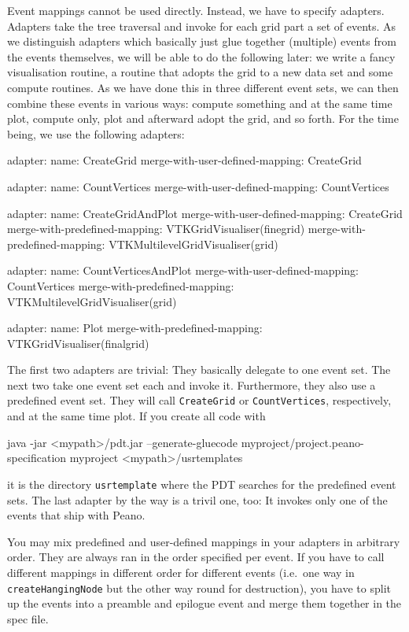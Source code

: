 \noindent
Event mappings cannot be used directly.
Instead, we have to specify adapters. 
Adapters take the tree traversal and invoke for each grid part a set of events. 
As we distinguish adapters which basically just glue together (multiple) events
from the events themselves, we will be able to do the following later:
we write a fancy visualisation routine, a routine that adopts the grid to a new
data set and some compute routines.
As we have done this in three different event sets, we can then combine these
events in various ways: compute something and at the same time plot, compute
only, plot and afterward adopt the grid, and so forth.
For the time being, we use the following adapters:

\begin{code}
adapter:
  name: CreateGrid
  merge-with-user-defined-mapping: CreateGrid

adapter:
  name: CountVertices
  merge-with-user-defined-mapping: CountVertices

adapter:
  name: CreateGridAndPlot
  merge-with-user-defined-mapping: CreateGrid
  merge-with-predefined-mapping: VTKGridVisualiser(finegrid)
  merge-with-predefined-mapping: VTKMultilevelGridVisualiser(grid)

adapter:
  name: CountVerticesAndPlot
  merge-with-user-defined-mapping: CountVertices
  merge-with-predefined-mapping: VTKMultilevelGridVisualiser(grid)

adapter:
  name: Plot
  merge-with-predefined-mapping: VTKGridVisualiser(finalgrid)
\end{code}

The first two adapters are trivial: 
They basically delegate to one event set. 
The next two take one event set each and invoke it. 
Furthermore, they also use a predefined event set. 
They will call \texttt{CreateGrid} or \texttt{CountVertices}, respectively, and
at the same time plot.
If you create all code with 

\begin{code}
java -jar <mypath>/pdt.jar --generate-gluecode
myproject/project.peano-specification myproject <mypath>/usrtemplates
\end{code}

\noindent
it is the directory \texttt{usrtemplate} where the PDT searches for the
predefined event sets.
The last adapter by the way is a trivil one, too: It invokes only one of the
events that ship with Peano.

\begin{remark}
You may mix predefined and user-defined mappings in your adapters in arbitrary
order. 
They are always ran in the order specified per event.
If you have to call different mappings in different order for different events
(i.e.~one way in \texttt{createHangingNode} but the other way round for
destruction), you have to split up the events into a preamble and epilogue event
and merge them together in the spec file.
\end{remark}

